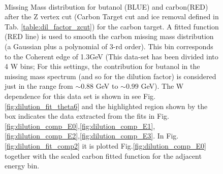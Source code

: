 \begin{figure}[H]
  \begin{center}
     \\
    \caption{Missing Mass distribution for butanol (BLUE) and carbon(RED) after the Z vertex cut (Carbon Target cut and ice removal defined in Tab. \ref{table:dil_factor_zcut}) for the carbon target. A fitted function (RED line)  is used to smooth the carbon missing mass distribution (a Gaussian plus a polynomial of 3-rd order). This bin corresponds to the Coherent edge of 1.3GeV (This data-set has been divided into 4 W bins; For this settings, the contribution for butanol in the missing mass spectrum (and so for the dilution factor) is considered just in the range from $\sim 0.88$ GeV to $\sim 0.99$ GeV). The W dependence for this data set is shown in see Fig. \ref{fig:dilution_fit_theta6} and the highlighted region shown by the box indicates the data extracted from the fits in Fig. \ref{fig:dilution_comp_E0},\ref{fig:dilution_comp_E1},\ref{fig:dilution_comp_E2},\ref{fig:dilution_comp_E3}.
      In Fig. \ref{fig:dilution_fit_comp2} it is plotted Fig.\ref{fig:dilution_comp_E0} together with the scaled carbon fitted function for the adjacent energy bin.  }
    \label{fig:dilution_fit_comp}
  \end{center}
\end{figure}

